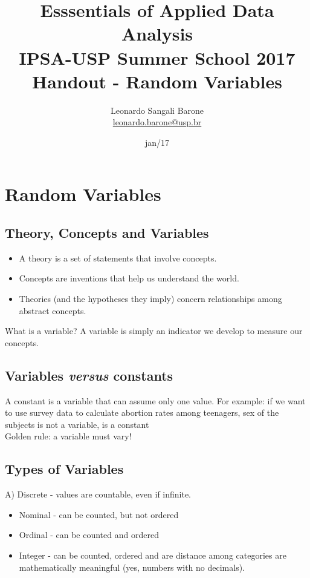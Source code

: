 \documentclass[11pt]{article}
\title{\textbf{Esssentials of Applied Data Analysis\\
				IPSA-USP Summer School 2017}\newline\\
				Handout - Random Variables}
\author{Leonardo Sangali Barone\\ \href{leonardo.barone@usp.br}{leonardo.barone@usp.br}}
\date{jan/17}
\begin{document}
\maketitle

\section*{Random Variables}

	\subsection*{Theory, Concepts and Variables}

	\begin{itemize}

	\item A theory is a set of statements that involve concepts.
	\item Concepts are inventions that help us understand the world.
	\item Theories (and the hypotheses they imply) concern relationships among abstract concepts.
	\end{itemize}
	What is a variable? A variable is simply an indicator we develop to measure our concepts.


	\subsection*{Variables \emph{versus} constants}
	A constant is a variable that can assume only one value. For example: if we want to use survey data to calculate abortion rates among teenagers, sex of the subjects is not a variable, is a constant\\
	
	Golden rule: a variable must vary!


	\subsection*{Types of Variables}
	
	A) Discrete - values are countable, even if infinite.
	
	\begin{itemize}
		\item Nominal - can be counted, but not ordered
		\item Ordinal - can be counted and ordered
		\item Integer - can be counted, ordered and are distance among categories are mathematically meaningful (yes, numbers with no decimals).
	\end{itemize}
	
\end{document}
